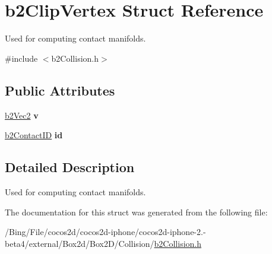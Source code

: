 \hypertarget{structb2_clip_vertex}{\section{b2\-Clip\-Vertex Struct Reference}
\label{structb2_clip_vertex}
}


Used for computing contact manifolds.  




{\ttfamily \#include $<$b2\-Collision.\-h$>$}

\subsection*{Public Attributes}
\begin{DoxyCompactItemize}
\item 
\hypertarget{structb2_clip_vertex_a6c8d8e4c0667755d5295a9c0d91d5b87}{\hyperlink{structb2_vec2}{b2\-Vec2} {\bfseries v}}\label{structb2_clip_vertex_a6c8d8e4c0667755d5295a9c0d91d5b87}

\item 
\hypertarget{structb2_clip_vertex_ac0f6d48eafc40a665bc18d4aa821689d}{\hyperlink{unionb2_contact_i_d}{b2\-Contact\-I\-D} {\bfseries id}}\label{structb2_clip_vertex_ac0f6d48eafc40a665bc18d4aa821689d}

\end{DoxyCompactItemize}


\subsection{Detailed Description}
Used for computing contact manifolds. 

The documentation for this struct was generated from the following file\-:\begin{DoxyCompactItemize}
\item 
/\-Bing/\-File/cocos2d/cocos2d-\/iphone/cocos2d-\/iphone-\/2.-\/beta4/external/\-Box2d/\-Box2\-D/\-Collision/\hyperlink{b2_collision_8h}{b2\-Collision.\-h}\end{DoxyCompactItemize}
